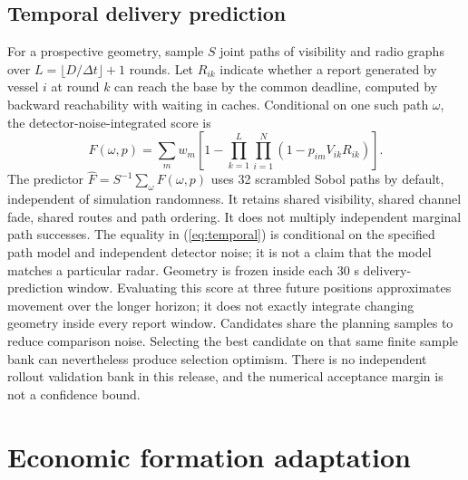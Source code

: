 \subsection{Temporal delivery prediction}
For a prospective geometry, sample $S$ joint paths of visibility and radio graphs
over $L=\lfloor D/\Delta t\rfloor+1$ rounds. Let $R_{ik}$ indicate whether a
report generated by vessel $i$ at round $k$ can reach the base by the common
deadline, computed by backward reachability with waiting in caches.
Conditional on one such path $\omega$, the detector-noise-integrated score is
\begin{equation}
 F(\omega,p)=\sum_m w_m
 \left[1-\prod_{k=1}^{L}\prod_{i=1}^{N}
 (1-p_{im}V_{ik}R_{ik})\right].\label{eq:temporal}
\end{equation}
The predictor $\widehat F=S^{-1}\sum_\omega F(\omega,p)$ uses 32 scrambled Sobol
paths by default, independent of simulation randomness. It retains shared
visibility, shared channel fade, shared routes and path ordering. It does not
multiply independent marginal path successes. The equality in
(\ref{eq:temporal}) is conditional on the specified path model and independent
detector noise; it is not a claim that the model matches a particular radar.
Geometry is frozen inside each 30 s delivery-prediction window. Evaluating this
score at three future positions approximates movement over the longer horizon;
it does not exactly integrate changing geometry inside every report window.
Candidates share the planning samples to reduce comparison noise. Selecting
the best candidate on that same finite sample bank can nevertheless produce
selection optimism. There is no independent rollout validation bank in this
release, and the numerical acceptance margin is not a confidence bound.

\section{Economic formation adaptation}
